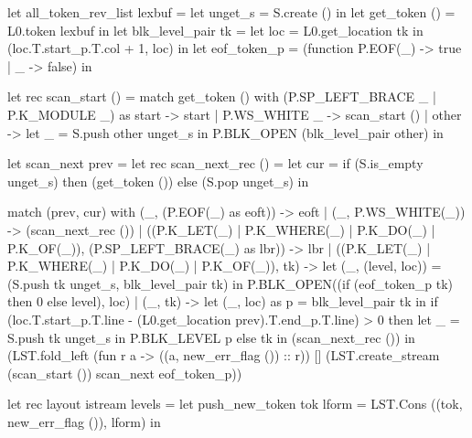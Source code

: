 \documentclass[mingoth,a4paper]{jsarticle}
\begin{document}
{{{{{{%
\begin{commandline}
let all_token_rev_list lexbuf =
  let unget_s = S.create () in
  let get_token () = L0.token lexbuf in
  let blk_level_pair tk =
    let loc = L0.get_location tk in (loc.T.start_p.T.col + 1, loc) in
  let eof_token_p = (function P.EOF(_) -> true | _ -> false) in

  let rec scan_start () =
    match get_token () with
        (P.SP_LEFT_BRACE _ | P.K_MODULE _) as start -> start
      | P.WS_WHITE _ -> scan_start ()
      | other ->
          let _ = S.push other unget_s in
            P.BLK_OPEN (blk_level_pair other)
  in

  let scan_next prev = 
    let rec scan_next_rec () =
      let cur =
        if (S.is_empty unget_s) then (get_token ())
        else (S.pop unget_s) in

        match (prev, cur) with
            (_, (P.EOF(_) as eoft)) -> eoft
          | (_, P.WS_WHITE(_)) -> (scan_next_rec ())
          | ((P.K_LET(_) | P.K_WHERE(_) | P.K_DO(_) | P.K_OF(_)), (P.SP_LEFT_BRACE(_) as lbr)) -> lbr
          | ((P.K_LET(_) | P.K_WHERE(_) | P.K_DO(_) | P.K_OF(_)), tk) ->
              let (_, (level, loc)) = (S.push tk unget_s, blk_level_pair tk) in
                P.BLK_OPEN((if (eof_token_p tk) then 0 else level), loc)
          | (_, tk) ->
              let (_, loc) as p = blk_level_pair tk in
                if (loc.T.start_p.T.line
                    - (L0.get_location prev).T.end_p.T.line) > 0 then
                  let _ = S.push tk unget_s in P.BLK_LEVEL p
                else tk
    in (scan_next_rec ())
  in
    (LST.fold_left
       (fun r a -> ((a, new_err_flag ()) :: r))
       []
       (LST.create_stream (scan_start ()) scan_next eof_token_p))
\end{commandline}

\begin{commandline}
let rec layout istream levels =
  let push_new_token tok lform =
    LST.Cons ((tok, new_err_flag ()), lform)
  in


\end{commandline}}}}}}}
\end{document}
